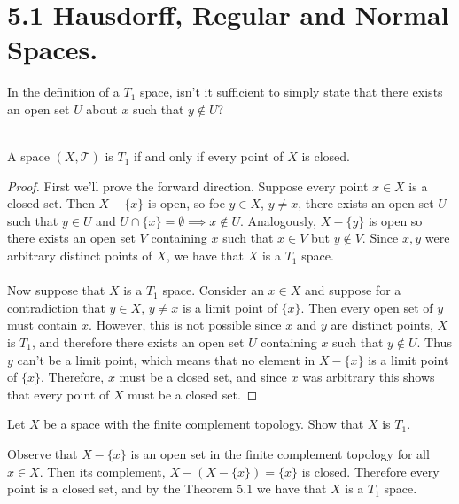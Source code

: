 \documentclass[a4paper,12pt,twoside]{hmcpset}
\begin{document}
\section*{5.1 Hausdorff, Regular and Normal Spaces.}

In the definition of a $T_1$ space, isn't it sufficient to simply
state that there exists an open set $U$ about $x$ such that $y \notin
U$? \\
\\

\begin{problem}[Theorem 5.1] A space $(X, \mathscr{T})$ is $T_1$ if
    and only if every point of $X$ is closed.
\end{problem}

\begin{proof}
    First we'll prove the forward direction.
    Suppose every point $x
    \in X$ is a closed set. Then $X - \{x\}$ is open, so 
    foe $y \in
    X$, $y \ne x$, 
    there exists an open set $U$ such that $y \in U$ and $U \cap
    \{x\} = \emptyset \implies x \notin U$. 
    Analogously, $X - \{y\}$ is open so 
    there exists
    an open set $V$ containing $x$ such that $x \in V$ but $y \notin
    V$. Since $x,y$ were arbitrary distinct points of $X$, we have
    that $X$ is a $T_1$ space. \\
    \\
    Now suppose that $X$ is a $T_1$ space. Consider an $x \in X$ and
    suppose for a contradiction 
    that $y \in X$, $y \ne x$ is a limit point of $\{x\}$. 
    Then every open set of $y$ must contain $x$. However, 
    this is not possible since $x$ and $y$ are distinct points, $X$ is
    $T_1$, and
    therefore there exists an open set $U$ containing $x$ such that $y
    \notin U$. Thus $y$ can't be a limit point, which means that no
    element in $X - \{x\}$ is a limit point of $\{x\}$. Therefore, $x$
    must be a closed set, and since $x$ was arbitrary this shows that
    every point of $X$ must be a closed set.
\end{proof}

\begin{exercise}[Exercise 5.2]
    Let $X$ be a space with the finite complement
    topology. Show that $X$ is $T_1$.
\end{exercise} 

\begin{solution}
    Observe that $X - \{x\}$ is an open set in the finite complement
    topology for all $x \in X$. Then its
    complement, $X - (X - \{x\}) = \{x\}$ is closed. Therefore 
    every point is a
    closed set, and by the Theorem 5.1 we have that $X$ is a $T_1$
    space.
\end{solution}
\end{document}
